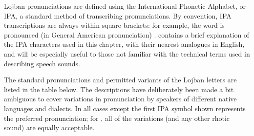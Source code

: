 Lojban pronunciations are defined using the International Phonetic Alphabet, or IPA, a standard method of transcribing pronunciations. By convention, IPA transcriptions are always within square brackets: for example, the word  is pronounced (in General American pronunciation) .  contains a brief explanation of the IPA characters used in this chapter, with their nearest analogues in English, and will be especially useful to those not familiar with the technical terms used in describing speech sounds.

The standard pronunciations and permitted variants of the Lojban letters are listed in the table below. The descriptions have deliberately been made a bit ambiguous to cover variations in pronunciation by speakers of different native languages and dialects. In all cases except  the first IPA symbol shown represents the preferred pronunciation; for , all of the variations (and any other rhotic sound) are equally acceptable.

